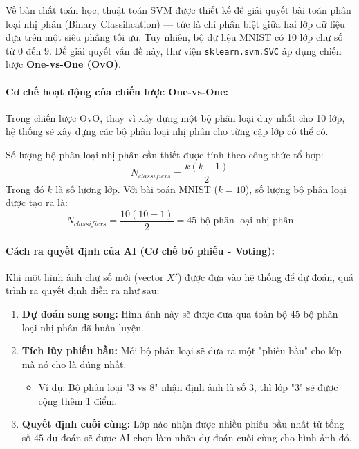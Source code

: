 \documentclass[../DoAn.tex]{subfiles}
\begin{document}
Về bản chất toán học, thuật toán SVM được thiết kế để giải quyết bài toán phân loại nhị phân (Binary Classification) — tức là chỉ phân biệt giữa hai lớp dữ liệu dựa trên một siêu phẳng tối ưu. Tuy nhiên, bộ dữ liệu MNIST có 10 lớp chữ số từ $0$ đến $9$. Để giải quyết vấn đề này, thư viện \texttt{sklearn.svm.SVC} áp dụng chiến lược \textbf{One-vs-One (OvO)}.

\paragraph{Cơ chế hoạt động của chiến lược One-vs-One:}
Trong chiến lược OvO, thay vì xây dựng một bộ phân loại duy nhất cho 10 lớp, hệ thống sẽ xây dựng các bộ phân loại nhị phân cho từng cặp lớp có thể có. 

Số lượng bộ phân loại nhị phân cần thiết được tính theo công thức tổ hợp:
\begin{equation}
    N_{classifiers} = \frac{k(k-1)}{2}
\end{equation}
Trong đó $k$ là số lượng lớp. Với bài toán MNIST ($k=10$), số lượng bộ phân loại được tạo ra là:
\begin{equation}
    N_{classifiers} = \frac{10(10-1)}{2} = 45 \text{ bộ phân loại nhị phân}
\end{equation}

\paragraph{Cách ra quyết định của AI (Cơ chế bỏ phiếu - Voting):}
Khi một hình ảnh chữ số mới (vector $X'$) được đưa vào hệ thống để dự đoán, quá trình ra quyết định diễn ra như sau:

\begin{enumerate}
    \item \textbf{Dự đoán song song:} Hình ảnh này sẽ được đưa qua toàn bộ $45$ bộ phân loại nhị phân đã huấn luyện.
    \item \textbf{Tích lũy phiếu bầu:} Mỗi bộ phân loại sẽ đưa ra một "phiếu bầu" cho lớp mà nó cho là đúng nhất. 
    \begin{itemize}
        \item Ví dụ: Bộ phân loại "3 vs 8" nhận định ảnh là số 3, thì lớp "3" sẽ được cộng thêm 1 điểm.
    \end{itemize}
    \item \textbf{Quyết định cuối cùng:} Lớp nào nhận được nhiều phiếu bầu nhất từ tổng số $45$ dự đoán sẽ được AI chọn làm nhãn dự đoán cuối cùng cho hình ảnh đó.\\
\end{enumerate}
\end{document}
